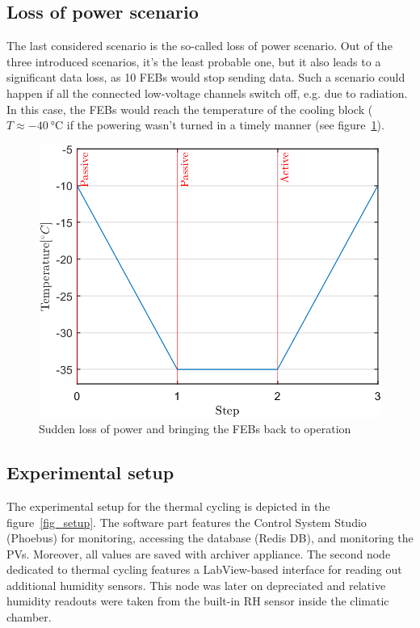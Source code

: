 \subsection{Loss of power scenario}
\label{power_loss}
The last considered scenario is the so-called loss of power scenario. Out of the three introduced scenarios, it's the least probable one, but it also leads to a significant data loss, as 10 \glspl{FEB} would stop sending data. Such a scenario could happen if all the connected low-voltage channels switch off, e.g. due to radiation. In this case, the \glspl{FEB} would reach the temperature of the cooling block ($T \approx \SI{-40}{\celsius}$ if the powering wasn't turned in a timely manner (see figure~\ref{fig_loss}).

\begin{figure}[!h]
\centering
\includegraphics[width=0.55\columnwidth]{Chapter3/Cycling/Images/switchoff.png}
\caption{Sudden loss of power and bringing the \glspl{FEB} back to operation}
\label{fig_loss}
\end{figure}

\subsection{Experimental setup}
\label{cycling_setup}
The experimental setup for the thermal cycling is depicted in the figure~\ref{fig_setup}. The software part features the Control System Studio (Phoebus) for monitoring, accessing the database (Redis DB), and monitoring the \gls{PV}s. Moreover, all values are saved with archiver appliance. The second node dedicated to thermal cycling features a LabView-based interface for reading out additional humidity sensors. This node was later on depreciated and relative humidity readouts were taken from the built-in \gls{RH} sensor inside the climatic chamber.


